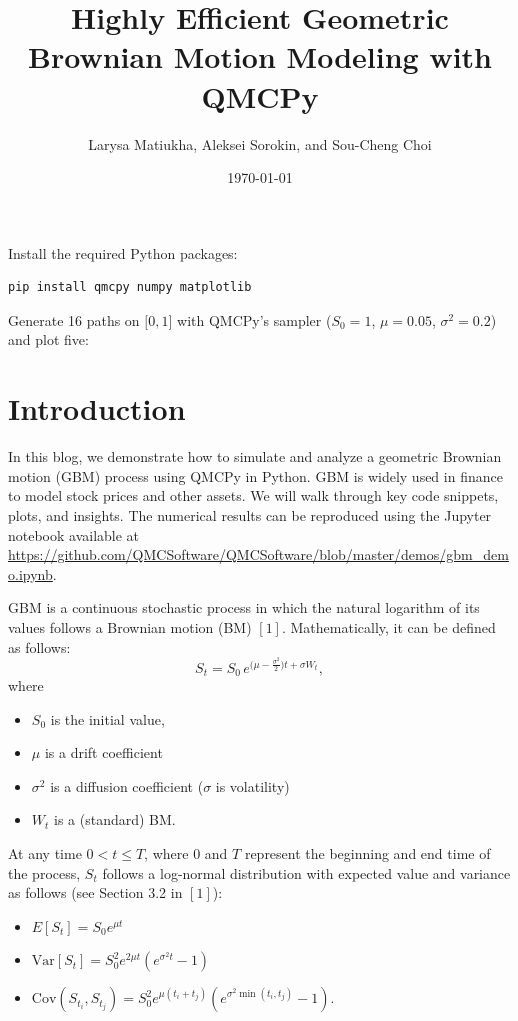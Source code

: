 \documentclass{article}
\title{Highly Efficient Geometric Brownian Motion Modeling with QMCPy}
\author{Larysa Matiukha, Aleksei Sorokin, and Sou-Cheng Choi}
\date{\today}
\begin{document}
\maketitle

\begin{tcolorbox}[title=Quick Start,colback=blue!1,colframe=blue!30!black,breakable]
Install the required Python packages:
%
\begin{lstlisting}[language=bash,basicstyle=\ttfamily,frame=none,numbers=none]
    pip install qmcpy numpy matplotlib
\end{lstlisting}

Generate 16 paths on $\lbrack 0,1\rbrack$ with QMCPy's sampler  ($S_0=1$, $\mu=0.05$, $\sigma^2=0.2$) and plot five:
%

\end{tcolorbox}


\section{Introduction}

In this blog, we demonstrate how to simulate and analyze a geometric Brownian motion (GBM) process using QMCPy in Python.
GBM is widely used in finance to model stock prices and other assets. 
We will walk through key code snippets, plots, and insights. The numerical results can be reproduced using the Jupyter notebook available at \href{gbm\_demo.ipynb}{\url{https://github.com/QMCSoftware/QMCSoftware/blob/master/demos/gbm\_demo.ipynb}}.

GBM is a continuous stochastic process in which the natural logarithm of its values follows a Brownian motion (BM) $[1]$.
Mathematically, it can be defined as follows:
\begin{equation}
S_t = S_0 \, e^{\bigl(\mu - \tfrac{\sigma^2}{2}\bigr)  t + \sigma W_t}, \label{gbm}
\end{equation}
where
\begin{itemize}
\item $S_0$ is the initial value, 
\item $\mu$ is a drift coefficient
\item $\sigma^2$ is a diffusion coefficient ($\sigma$ is volatility)
\item $W_t$ is a (standard) BM.
\end{itemize}

At any time $0 < t \le T$, where $0$ and $T$ represent the beginning and end time of the process, $S_t$ follows a log-normal distribution with expected value and variance as follows (see Section 3.2 in $[1]$):
\begin{itemize}
\item
 $E[S_t] = S_0 e^{\mu t}$
\item $\text{Var}[S_t] = S_0^2 e^{2\mu t}(e^{\sigma^2 t} - 1)$
\item   $  
    \text{Cov}(S_{t_i}, S_{t_j}) = S_0^2 e^{\mu(t_i + t_j)} \left(e^{\sigma^2 \min(t_i, t_j)} - 1\right).$
\end{itemize}
\end{document}
